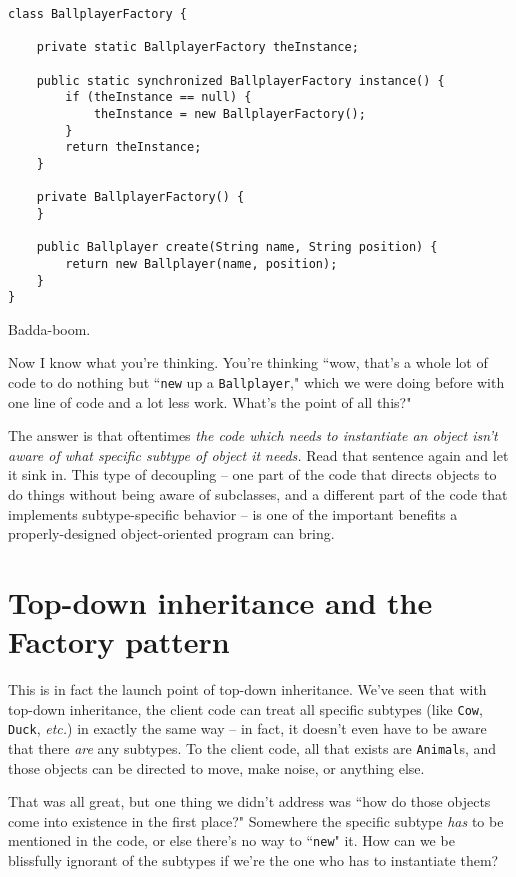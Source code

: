\begin{Verbatim}[fontsize=\small,samepage=true,frame=single]
class BallplayerFactory {

    private static BallplayerFactory theInstance;
    
    public static synchronized BallplayerFactory instance() {
        if (theInstance == null) {
            theInstance = new BallplayerFactory();
        }
        return theInstance;
    }

    private BallplayerFactory() {
    }

    public Ballplayer create(String name, String position) {
        return new Ballplayer(name, position);
    }
}
\end{Verbatim}

Badda-boom.

Now I know what you're thinking. You're thinking ``wow, that's a whole lot of
code to do nothing but ``\texttt{new} up a \texttt{Ballplayer}," which we were
doing before with one line of code and a lot less work. What's the point of
all this?"

The answer is that oftentimes \textit{the code which needs to instantiate an
object isn't aware of what specific subtype of object it needs.} Read that
sentence again and let it sink in. This type of decoupling -- one part of the
code that directs objects to do things without being aware of subclasses, and
a different part of the code that implements subtype-specific behavior -- is
one of the important benefits a properly-designed object-oriented program can
bring.

\section{Top-down inheritance and the Factory pattern}

This is in fact the launch point of top-down inheritance. We've seen that with
top-down inheritance, the client code can treat all specific subtypes (like
\texttt{Cow}, \texttt{Duck}, \textit{etc.}) in exactly the same way -- in
fact, it doesn't even have to be aware that there \textit{are} any subtypes.
To the client code, all that exists are \texttt{Animal}s, and those objects
can be directed to move, make noise, or anything else.

That was all great, but one thing we didn't address was ``how do those objects
come into existence in the first place?" Somewhere the specific subtype
\textit{has} to be mentioned in the code, or else there's no way to
``\texttt{new}" it. How can we be blissfully ignorant of the subtypes if we're
the one who has to instantiate them?

